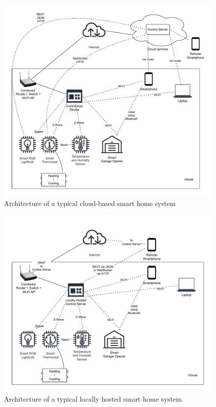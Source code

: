 \begin{figure}[!ht]
    \centering
    \includegraphics[page=1,keepaspectratio,width=150mm]{figures/sh_architecture_cloud.drawio.pdf}
    \caption{Architecture of a typical cloud-based smart home system}
    \label{fig:SHCloud}
\end{figure}

\begin{figure}[!ht]
    \centering
    \includegraphics[page=1,keepaspectratio,width=150mm]{figures/sh_architecture_local.drawio.pdf}
    \caption{Architecture of a typical locally hosted smart home system}
    \label{fig:SHLocal}
\end{figure}

